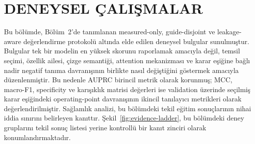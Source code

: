 \chapter{DENEYSEL ÇALIŞMALAR}
\label{chap:deneysel}

Bu bölümde, Bölüm~2'de tanımlanan measured-only, guide-disjoint ve leakage-aware değerlendirme protokolü altında elde edilen deneysel bulgular sunulmuştur. Bulgular tek bir modelin en yüksek skorunu raporlamak amacıyla değil, temsil seçimi, özellik ailesi, çizge semantiği, attention mekanizması ve karar eşiğine bağlı nadir negatif tanıma davranışının birlikte nasıl değiştiğini göstermek amacıyla düzenlenmiştir. Bu nedenle AUPRC birincil metrik olarak korunmuş; MCC, macro-F1, specificity ve karışıklık matrisi değerleri ise validation üzerinde seçilmiş karar eşiğindeki operating-point davranışının ikincil tanılayıcı metrikleri olarak değerlendirilmiştir. Sağlamlık analizi, bu bölümdeki tekil eğitim sonuçlarının nihai iddia sınırını belirleyen kanıttır. Şekil~\ref{fig:evidence-ladder}, bu bölümdeki deney gruplarını tekil sonuç listesi yerine kontrollü bir kanıt zinciri olarak konumlandırmaktadır.

